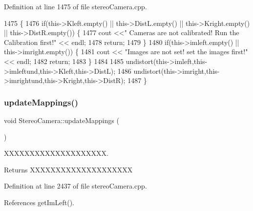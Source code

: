 Definition at line 1475 of file stereo\+Camera.\+cpp.


\begin{DoxyCode}
1475                                    \{
1476     \textcolor{keywordflow}{if}(this->Kleft.empty() || this->DistL.empty() || this->Kright.empty() || this->DistR.empty()) \{
1477         cout <<\textcolor{stringliteral}{" Cameras are not calibrated! Run the Calibration first!"} << endl;
1478         \textcolor{keywordflow}{return};
1479     \}
1480     \textcolor{keywordflow}{if}(this->imleft.empty() || this->imright.empty()) \{
1481         cout << \textcolor{stringliteral}{"Images are not set! set the images first!"} << endl;
1482         \textcolor{keywordflow}{return};
1483     \}
1484 
1485     undistort(this->imleft,this->imleftund,this->Kleft,this->DistL);
1486     undistort(this->imright,this->imrightund,this->Kright,this->DistR);
1487 \}
\end{DoxyCode}
\mbox{\label{classStereoCamera_a5b15c07def1c09f53bfc6141f303fa09}} 
\subsubsection{\texorpdfstring{update\+Mappings()}{updateMappings()}}
{\footnotesize\ttfamily void Stereo\+Camera\+::update\+Mappings (\begin{DoxyParamCaption}{ }\end{DoxyParamCaption})}



X\+X\+X\+X\+X\+X\+X\+X\+X\+X\+X\+X\+X\+X\+X\+X\+X\+X\+XX. 

\begin{DoxyReturn}{Returns}
X\+X\+X\+X\+X\+X\+X\+X\+X\+X\+X\+X\+X\+X\+X\+X\+X\+X\+XX 
\end{DoxyReturn}


Definition at line 2437 of file stereo\+Camera.\+cpp.



References get\+Im\+Left().


